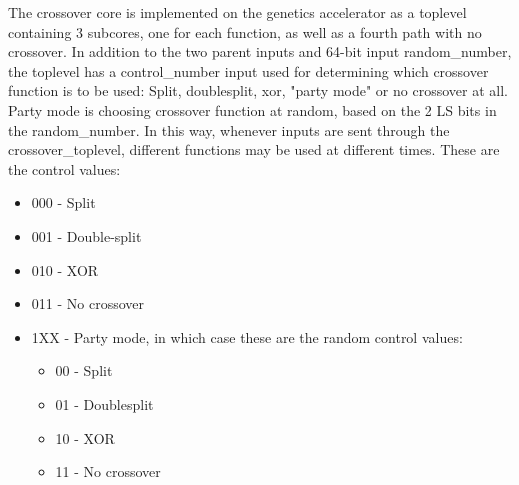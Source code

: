 The crossover core is implemented on the genetics accelerator as a toplevel containing 3 subcores, one for each function, as well as a fourth path with no crossover. In addition to the two parent inputs and 64-bit input random\_number, the toplevel has a control\_number input used for determining which crossover function is to be used: Split, doublesplit, xor, "party mode" or no crossover at all. Party mode is choosing crossover function at random, based on the 2 LS bits in the random\_number. In this way, whenever inputs are sent through the crossover\_toplevel, different functions may be used at different times. These are the control values:
\begin{itemize}
\item 000 - Split
\item 001 - Double-split
\item 010 - XOR
\item 011 - No crossover
\item 1XX - Party mode, in which case these are the random control values:
    \begin{itemize}
    \item 00 - Split
    \item 01 - Doublesplit
    \item 10 - XOR
    \item 11 - No crossover
    \end{itemize}
\end{itemize}